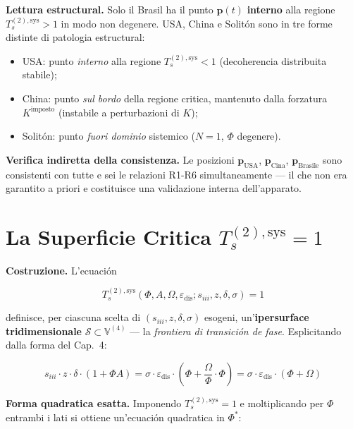 \Hypoth{} \textbf{Lettura estructural.} Solo il Brasil ha il punto
\(\boldsymbol{p}(t)\) \textbf{interno} alla regione
\(T_s^{(2),\text{sys}} > 1\) in modo non degenere. USA, China e Solitón
sono in tre forme distinte di patologia estructural:

\begin{itemize}
\tightlist
\item
  USA: punto \emph{interno} alla regione \(T_s^{(2),\text{sys}} < 1\)
  (decoherencia distribuita stabile);
\item
  China: punto \emph{sul bordo} della regione critica, mantenuto dalla
  forzatura \(K^{\text{imposto}}\) (instabile a perturbazioni di \(K\));
\item
  Solitón: punto \emph{fuori dominio} sistemico (\(N=1\), \(\Phi\)
  degenere).
\end{itemize}

\Proved{} \textbf{Verifica indiretta della consistenza.} Le posizioni
\(\boldsymbol{p}_{\text{USA}}\), \(\boldsymbol{p}_{\text{Cina}}\),
\(\boldsymbol{p}_{\text{Brasile}}\) sono consistenti con tutte e sei le
relazioni R1-R6 simultaneamente --- il che non era garantito a priori e
costituisce una validazione interna dell'apparato.



\section{\texorpdfstring{La Superficie Critica
\(T_s^{(2),\text{sys}} = 1\)}{La Superficie Critica T\_s\^{}\{(2),\textbackslash text\{sys\}\} = 1}}\label{la-superficie-critica-t_s2textsys-1}

\Hypoth{} \textbf{Costruzione.} L'ecuación

\[
T_s^{(2),\text{sys}}(\Phi, A, \Omega, \varepsilon_{\text{dis}}; s_{iii}, z, \delta, \sigma) = 1
\]

definisce, per ciascuna scelta di \((s_{iii}, z, \delta, \sigma)\)
esogeni, un'\textbf{ipersurface tridimensionale}
\(\mathcal{S} \subset \mathbb{V}^{(4)}\) --- la \emph{frontiera di
transición de fase}. Esplicitando dalla forma del Cap.~4:

\[
s_{iii} \cdot z \cdot \delta \cdot (1 + \Phi A) = \sigma \cdot \varepsilon_{\text{dis}} \cdot \left(\Phi + \frac{\Omega}{\Phi} \cdot \Phi\right) = \sigma \cdot \varepsilon_{\text{dis}} \cdot (\Phi + \Omega)
\]

\Hypoth{} \textbf{Forma quadratica esatta.} Imponendo
\(T_s^{(2),\text{sys}} = 1\) e moltiplicando per \(\Phi\) entrambi i
lati si ottiene un'ecuación quadratica in \(\Phi^*\):

